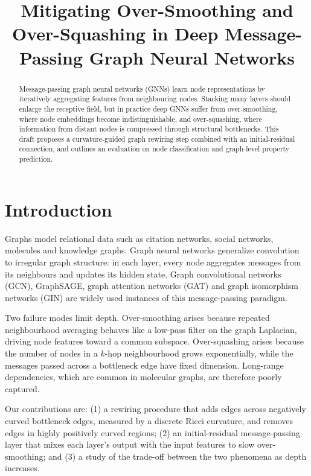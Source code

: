 \documentclass{article}
\title{Mitigating Over-Smoothing and Over-Squashing in Deep Message-Passing Graph Neural Networks}
\begin{document}
\maketitle

\begin{abstract}
Message-passing graph neural networks (GNNs) learn node representations by
iteratively aggregating features from neighbouring nodes. Stacking many layers
should enlarge the receptive field, but in practice deep GNNs suffer from
over-smoothing, where node embeddings become indistinguishable, and
over-squashing, where information from distant nodes is compressed through
structural bottlenecks. This draft proposes a curvature-guided graph rewiring
step combined with an initial-residual connection, and outlines an evaluation
on node classification and graph-level property prediction.
\end{abstract}

\section{Introduction}
Graphs model relational data such as citation networks, social networks,
molecules and knowledge graphs. Graph neural networks generalize convolution to
irregular graph structure: in each layer, every node aggregates messages from
its neighbours and updates its hidden state. Graph convolutional networks
(GCN), GraphSAGE, graph attention networks (GAT) and graph isomorphism
networks (GIN) are widely used instances of this message-passing paradigm.

Two failure modes limit depth. Over-smoothing arises because repeated
neighbourhood averaging behaves like a low-pass filter on the graph Laplacian,
driving node features toward a common subspace. Over-squashing arises because
the number of nodes in a $k$-hop neighbourhood grows exponentially, while the
messages passed across a bottleneck edge have fixed dimension. Long-range
dependencies, which are common in molecular graphs, are therefore poorly
captured.

Our contributions are: (1) a rewiring procedure that adds edges across
negatively curved bottleneck edges, measured by a discrete Ricci curvature,
and removes edges in highly positively curved regions; (2) an initial-residual
message-passing layer that mixes each layer's output with the input features
to slow over-smoothing; and (3) a study of the trade-off between the two
phenomena as depth increases.
\end{document}
